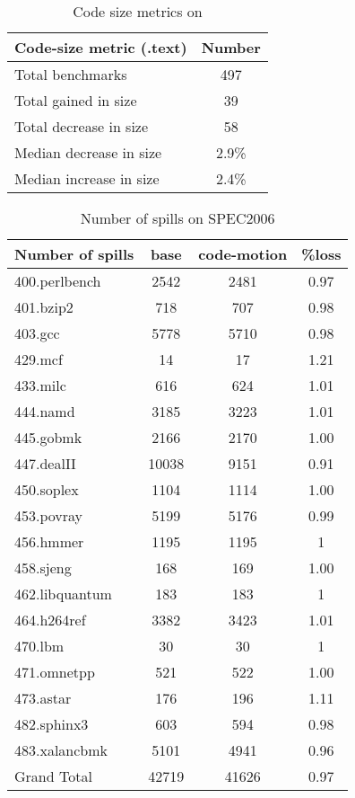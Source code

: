 \documentclass[acmlarge,review]{acmart}\settopmatter{printfolios=true}
\begin{document}
\begin{table}[h!]
  \begin{center}
    \begin{tabular}{|l|c|}
      \hline
      Code-size metric  (.text)                   & Number   \\\hline
      Total  benchmarks                           & 497      \\\hline
      Total  gained in size                       & 39       \\\hline
      Total  decrease in size                     & 58       \\\hline
      Median decrease in size                     & 2.9\%    \\\hline
      Median increase in size                     & 2.4\%    \\\hline
    \end{tabular}
  \end{center}
  \caption{Code size metrics on \LLVMTestSuite{}}
  \label{tab:code-size}
\end{table}

\begin{table}[h!]
  \begin{center}
    \begin{tabular}{|l|c|c|c|}
      \hline
Number of spills                &base   &code-motion &\%loss \\\hline
400.perlbench	&2542	&2481	&0.97\\\hline
401.bzip2	        &718	&707	&0.98\\\hline
403.gcc	        &5778	&5710	&0.98\\\hline
429.mcf	        &14	&17	&1.21\\\hline
433.milc	        &616	&624	&1.01\\\hline
444.namd	        &3185	&3223	&1.01\\\hline
445.gobmk	        &2166	&2170	&1.00\\\hline
447.dealII	        &10038	&9151	&0.91\\\hline
450.soplex	        &1104	&1114	&1.00\\\hline
453.povray	        &5199	&5176	&0.99\\\hline
456.hmmer	        &1195	&1195	&1   \\\hline
458.sjeng	        &168	&169	&1.00\\\hline
462.libquantum	&183	&183	&1   \\\hline
464.h264ref	&3382	&3423	&1.01\\\hline
470.lbm	        &30	&30	&1   \\\hline
471.omnetpp	&521	&522	&1.00\\\hline
473.astar	        &176	&196	&1.11\\\hline
482.sphinx3	&603	&594	&0.98\\\hline
483.xalancbmk	&5101	&4941	&0.96\\\hline
Grand Total	                &42719	&41626	&0.97\\\hline
    \end{tabular}
  \end{center}
  \caption{Number of spills on SPEC2006}
  \label{tab:code-size}
\end{table}
\end{document}
